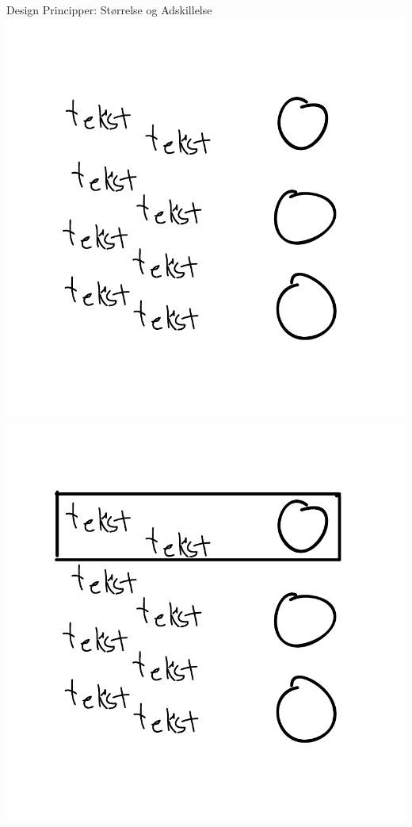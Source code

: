 \documentclass[10pt]{beamer}
\begin{document}
\begin{frame}{Design Principper: Størrelse og Adskillelse}
	\includegraphics[scale=0.31]{img/boxinguden.pdf}\quad%
	\includegraphics[scale=0.31]{img/boxingmed.pdf}
\end{frame}
\end{document}
